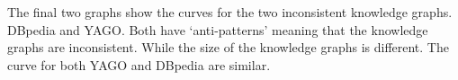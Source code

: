\documentclass[11pt,letterpaper ,oneside ]{book}
\begin{document}
	\begin{figure}[!t]
	\end{figure}
	
	The final two graphs show the curves for the two inconsistent knowledge graphs. DBpedia and YAGO. Both have `anti-patterns' meaning that the knowledge graphs are inconsistent. While the size of the knowledge graphs is different. The curve for both YAGO and DBpedia are similar. 
	
\end{document}
